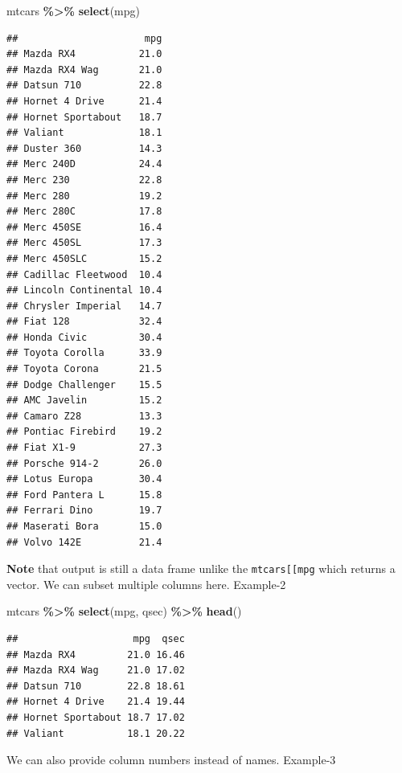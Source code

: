 \documentclass[
]{book}
\newenvironment{Shaded}{\begin{snugshade}}{\end{snugshade}}
\newcommand{\FunctionTok}[1]{\textcolor[rgb]{0.13,0.29,0.53}{\textbf{#1}}}
\newcommand{\NormalTok}[1]{#1}
\newcommand{\SpecialCharTok}[1]{\textcolor[rgb]{0.81,0.36,0.00}{\textbf{#1}}}
\begin{document}
\begin{Shaded}
\begin{Highlighting}[]
\NormalTok{mtcars }\SpecialCharTok{\%\textgreater{}\%} 
  \FunctionTok{select}\NormalTok{(mpg)}
\end{Highlighting}
\end{Shaded}

\begin{verbatim}
##                      mpg
## Mazda RX4           21.0
## Mazda RX4 Wag       21.0
## Datsun 710          22.8
## Hornet 4 Drive      21.4
## Hornet Sportabout   18.7
## Valiant             18.1
## Duster 360          14.3
## Merc 240D           24.4
## Merc 230            22.8
## Merc 280            19.2
## Merc 280C           17.8
## Merc 450SE          16.4
## Merc 450SL          17.3
## Merc 450SLC         15.2
## Cadillac Fleetwood  10.4
## Lincoln Continental 10.4
## Chrysler Imperial   14.7
## Fiat 128            32.4
## Honda Civic         30.4
## Toyota Corolla      33.9
## Toyota Corona       21.5
## Dodge Challenger    15.5
## AMC Javelin         15.2
## Camaro Z28          13.3
## Pontiac Firebird    19.2
## Fiat X1-9           27.3
## Porsche 914-2       26.0
## Lotus Europa        30.4
## Ford Pantera L      15.8
## Ferrari Dino        19.7
## Maserati Bora       15.0
## Volvo 142E          21.4
\end{verbatim}

\textbf{Note} that output is still a data frame unlike the \texttt{mtcars{[}{[}\textquotesingle{}mpg\textquotesingle{}{]}{]}} which returns a vector. We can subset multiple columns here. Example-2

\begin{Shaded}
\begin{Highlighting}[]
\NormalTok{mtcars }\SpecialCharTok{\%\textgreater{}\%} 
  \FunctionTok{select}\NormalTok{(mpg, qsec) }\SpecialCharTok{\%\textgreater{}\%} 
  \FunctionTok{head}\NormalTok{()}
\end{Highlighting}
\end{Shaded}

\begin{verbatim}
##                    mpg  qsec
## Mazda RX4         21.0 16.46
## Mazda RX4 Wag     21.0 17.02
## Datsun 710        22.8 18.61
## Hornet 4 Drive    21.4 19.44
## Hornet Sportabout 18.7 17.02
## Valiant           18.1 20.22
\end{verbatim}

We can also provide column numbers instead of names. Example-3
\end{document}
